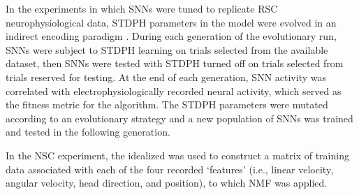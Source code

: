 
In the experiments in which \acp{SNN} were tuned to replicate \ac{RSC} neurophysiological data, \ac{STDPH} parameters in the model were evolved in an indirect encoding paradigm \cite{Rounds2016}. During each generation of the evolutionary run, \acp{SNN} were subject to \ac{STDPH} learning on trials selected from the available dataset, then \acp{SNN} were tested with \ac{STDPH} turned off on trials selected from trials reserved for testing. At the end of each generation, \ac{SNN} activity 
was correlated with electrophysiologically recorded neural activity, which served as the fitness metric for the algorithm. The \ac{STDPH} parameters were mutated according to an evolutionary strategy and a new population of \acp{SNN} was trained and tested in the following generation.


In the \ac{NSC} experiment, the idealized 
was used to construct a matrix of training data associated with each of the four recorded `features' (i.e., linear velocity, angular velocity, head direction, and position), to which \ac{NMF} was applied.



